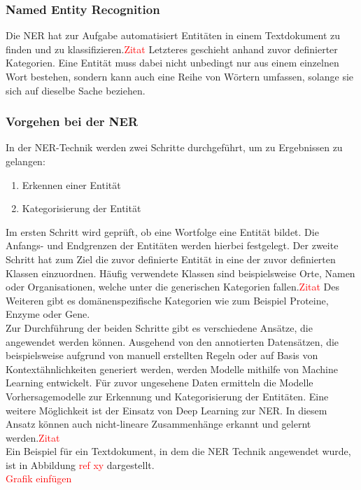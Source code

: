 \subsubsection{Named Entity Recognition}
Die \acl{NER} hat zur Aufgabe automatisiert Entitäten in einem Textdokument zu finden und zu klassifizieren.\textcolor{red}{Zitat} Letzteres geschieht anhand zuvor definierter Kategorien.
Eine Entität muss dabei nicht unbedingt nur aus einem einzelnen Wort bestehen, sondern kann auch eine Reihe von Wörtern umfassen, solange sie sich auf dieselbe Sache beziehen.

\subsubsection{Vorgehen bei der NER}
In der \ac{NER}-Technik werden zwei Schritte durchgeführt, um zu Ergebnissen zu gelangen:

\begin{enumerate}
    \item Erkennen einer Entität
    \item Kategorisierung der Entität
\end{enumerate}


Im ersten Schritt wird geprüft, ob eine Wortfolge eine Entität bildet. Die Anfangs- und Endgrenzen der Entitäten werden hierbei festgelegt. Der zweite Schritt hat zum Ziel die zuvor definierte Entität in eine der zuvor definierten Klassen einzuordnen.
Häufig verwendete Klassen sind beispielsweise Orte, Namen oder Organisationen, welche unter die generischen Kategorien fallen.\textcolor{red}{Zitat} Des Weiteren gibt es domänenspezifische Kategorien wie zum Beispiel Proteine, Enzyme oder Gene.
\\
Zur Durchführung der beiden Schritte gibt es verschiedene Ansätze, die angewendet werden können. Ausgehend von den annotierten Datensätzen, die beispielsweise aufgrund von manuell erstellten Regeln oder auf Basis von Kontextähnlichkeiten generiert werden, werden Modelle mithilfe von Machine Learning entwickelt.
Für zuvor ungesehene Daten ermitteln die Modelle Vorhersagemodelle zur Erkennung und Kategorisierung der Entitäten. Eine weitere Möglichkeit ist der Einsatz von Deep Learning zur \ac{NER}. In diesem Ansatz können auch nicht-lineare Zusammenhänge erkannt und gelernt werden.\textcolor{red}{Zitat}
\\
Ein Beispiel für ein Textdokument, in dem die \ac{NER} Technik angewendet wurde, ist in Abbildung \textcolor{red}{ref xy} dargestellt.\\
\textcolor{red}{Grafik einfügen} \\

